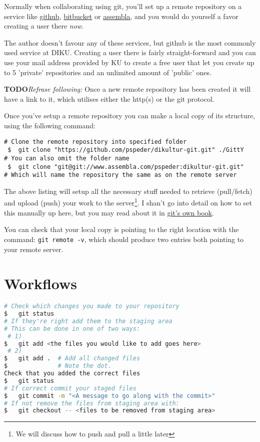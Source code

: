 \documentclass[11pt,a4paper,oneside,final,titlepage]{article}
\newcommand{\todo}[1]{\color{red}\textbf{TODO}\hspace{0.1in}\textit{#1}\color{black}}
\begin{document}
Normally when collaborating using git, you'll set up a remote repository on a
service like \mbox{\href{http://github.com}{github}},
\mbox{\href{http://bitbucket.com}{bitbucket}} or
\mbox{\href{http://assembla.com}{assembla}}, and you would do yourself a favor
creating a user there \textit{now}.

The author doesn't favour any of these services, but github is the most commonly
used service at DIKU. Creating a user there is fairly straight-forward and you
can use your mail address provided by KU to create a free user that let you
create up to 5 'private' repositories and an unlimited amount of 'public' ones.

\todo{Refrase following:} Once a new remote repository has been created it will have a link to it, which
utilises either the http(s) or the git protocol.

Once you've setup a remote repository you can make a local copy of its structure,
using the following command:
\begin{lstlisting}[label=lst:cloning,caption=How to clone a repository,
                   name=lst:cloning,style=git]
# Clone the remote repository into specified folder
 $  git clone "https://github.com/pspeder/dikultur-git.git" ./GittY
# You can also omit the folder name
 $  git clone "git@git://www.assembla.com/pspeder:dikultur-git.git"
# Which will name the repository the same as on the remote server
\end{lstlisting}
The above listing will setup all the necessary stuff needed to retrieve
(pull/fetch) and upload (push) your work to the server\footnote{We will discuss
how to push and pull a little later}. I shan't go into detail on how to set this
manually up here, but you may read about it in \href{http://scm-git.com/book/}
{git's own book}.

You can check that your local copy is pointing to the right location with the
command: \lstinline[style=git]{git remote -v}, which should produce two entries
both pointing to your remote server.

\section{Workflows}
\begin{lstlisting}[language=bash
                  ,label=lst:generalFlow
                  ,name=lst:generalFlow
                  ,caption=General workflow when working with git]
# Check which changes you made to your repository
$   git status
# If they're right add them to the staging area
# This can be done in one of two ways:
 # 1)
$   git add <the files you would like to add goes here>
 # 2)
$   git add .  # Add all changed files
$              # Note the dot.
Check that you added the correct files
$   git status
# If correct commit your staged files
$   git commit -m "<A message to go along with the commit>"
# If not remove the files from staging area with:
$   git checkout -- <files to be removed from staging area>
\end{lstlisting}
\end{document}
